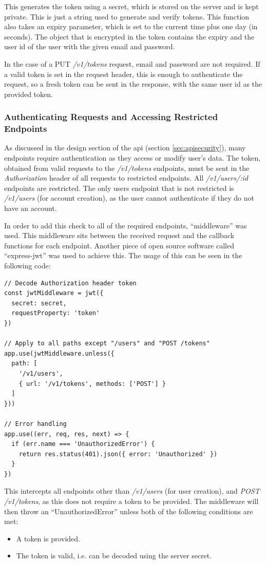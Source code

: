 \documentclass[11pt,openright,a4paper]{report}
\begin{document}
This generates the token using a secret, which is stored on the server and is kept private. This is just a string used to generate and verify tokens. This function also takes an expiry parameter, which is set to the current time plus one day (in seconds). The object that is encrypted in the token contains the expiry and the user id of the user with the given email and password.

In the case of a PUT \emph{/v1/tokens} request, email and password are not required. If a valid token is set in the request header, this is enough to authenticate the request, so a fresh token can be sent in the response, with the same user id as the provided token.

\subsubsection{Authenticating Requests and Accessing Restricted Endpoints}
As discussed in the design section of the api (section \ref{sec:apisecurity}), many endpoints require authentication as they access or modify user's data. The token, obtained from valid requests to the \emph{/v1/tokens} endpoints, must be sent in the \emph{Authorization} header of all requests to restricted endpoints. All \emph{/v1/users/:id} endpoints are restricted. The only users endpoint that is not restricted is \emph{/v1/users} (for account creation), as the user cannot authenticate if they do not have an account.

In order to add this check to all of the required endpoints, \enquote{middleware} was used. This middleware sits between the received request and the callback functions for each endpoint. Another piece of open source software called \enquote{express-jwt} \parencite{expressjwt} was used to achieve this. The usage of this can be seen in the following code:
\begin{lstlisting}
// Decode Authorization header token
const jwtMiddleware = jwt({
  secret: secret,
  requestProperty: 'token'
})

// Apply to all paths except "/users" and "POST /tokens"
app.use(jwtMiddleware.unless({
  path: [
    '/v1/users',
    { url: '/v1/tokens', methods: ['POST'] }
  ]
}))

// Error handling
app.use((err, req, res, next) => {
  if (err.name === 'UnauthorizedError') {
    return res.status(401).json({ error: 'Unauthorized' })
  }
})
\end{lstlisting}
This intercepts all endpoints other than \emph{/v1/users} (for user creation), and \emph{POST /v1/tokens}, as this does not require a token to be provided. The middleware will then throw an \enquote{UnauthorizedError} unless both of the following conditions are met:
\begin{itemize}
\item A token is provided.
\item The token is valid, i.e. can be decoded using the server secret.
\end{itemize}
\end{document}

